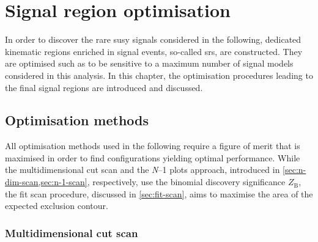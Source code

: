 

\chapter{Signal region optimisation}\label{ch:signal_region_optimisation}

\graphicspath{{chapter-optimisation/Figs/Vector/}{chapter-optimisation/Figs/}}


In order to discover the rare \gls{susy} signals considered in the following, dedicated kinematic regions enriched in signal events, so-called \glspl{sr}, are constructed.
They are optimised such as to be sensitive to a maximum number of signal models considered in this analysis.
In this chapter, the optimisation procedures leading to the final signal regions are introduced and discussed. 

\section{Optimisation methods}

All optimisation methods used in the following require a figure of merit that is maximised in order to find configurations yielding optimal performance.
While the multidimensional cut scan and the \textit{N}--1 plots approach, introduced in \cref{sec:n-dim-scan,sec:n-1-scan}, respectively, use the binomial discovery significance $Z_\mathrm{B}$, the fit scan procedure, discussed in \cref{sec:fit-scan}, aims to maximise the area of the expected exclusion contour.

\subsection{Multidimensional cut scan}\label{sec:n-dim-scan}

